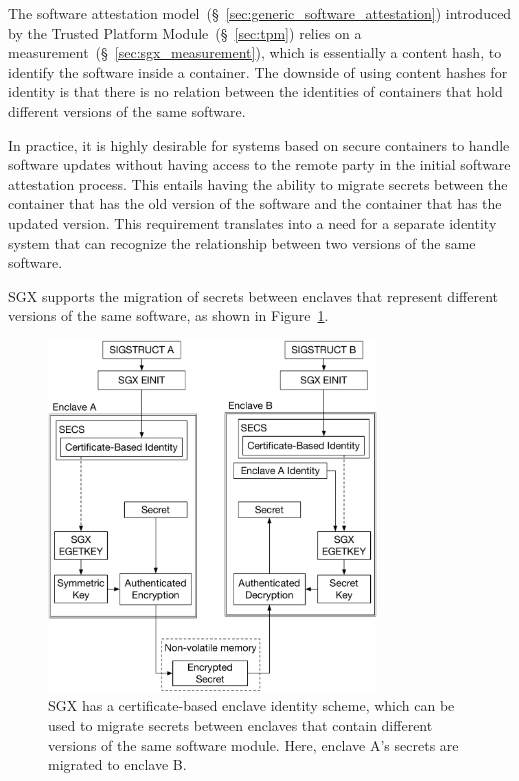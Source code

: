 \label{sec:sgx_versioning}

The software attestation model~(\S~\ref{sec:generic_software_attestation})
introduced by the Trusted Platform Module~(\S~\ref{sec:tpm}) relies on a
measurement~(\S~\ref{sec:sgx_measurement}), which is essentially a content
hash, to identify the software inside a container. The downside of using
content hashes for identity is that there is no relation between the identities
of containers that hold different versions of the same software.

In practice, it is highly desirable for systems based on secure containers to
handle software updates without having access to the remote party in the initial
software attestation process. This entails having the ability to migrate secrets
between the container that has the old version of the software and the container
that has the updated version. This requirement translates into a need for a
separate identity system that can recognize the relationship between two versions
of the same software.

SGX supports the migration of secrets between enclaves that represent different
versions of the same software, as shown in
Figure~\ref{fig:sgx_secret_migration}.

\begin{figure}[hbt]
  \centering
  \includegraphics[width=87mm]{figures/sgx_secret_migration.pdf}
  \caption{
    SGX has a certificate-based enclave identity scheme, which can be used to
    migrate secrets between enclaves that contain different versions of the
    same software module. Here, enclave A's secrets are migrated to enclave B.
  }
  \label{fig:sgx_secret_migration}
\end{figure}

